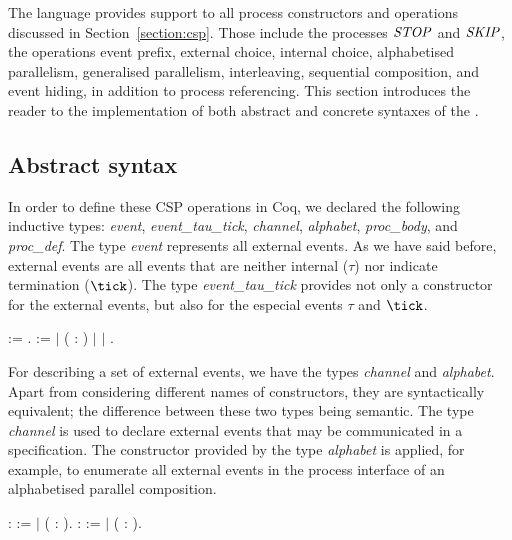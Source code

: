 The \CSPcoq{} language provides support to all process constructors and operations discussed in Section~\ref{section:csp}. Those include the processes $ \mathit{\mathord{{STOP}}} $ and $ \mathit{\mathord{{SKIP}}} $, the operations event prefix, external choice, internal choice, alphabetised parallelism, generalised parallelism, interleaving, sequential composition, and event hiding, in addition to process referencing. This section introduces the reader to the implementation of both abstract and concrete syntaxes of the \CSPcoq{}.

\subsection{Abstract syntax}

In order to define these CSP operations in Coq, we declared the following inductive types: \emph{event}, \emph{event\_tau\_tick}, \emph{channel}, \emph{alphabet}, \emph{proc\_body}, and \emph{proc\_def}. The type \emph{event} represents all external events. As we have said before, external events are all events that are neither internal ($ \tau $) nor indicate termination ($ \tick $). The type \emph{event\_tau\_tick} provides not only a constructor for the external events, but also for the especial events $ \tau $ and $ \tick $.

\begin{coqdoccode}
	\coqdocnoindent
	  := .\coqdoceol
	\coqdocnoindent
	  :=\coqdoceol
	\coqdocindent{1.00em}
	\ensuremath{|}  ( : )\coqdoceol
	\coqdocindent{1.00em}
	\ensuremath{|} \coqdoceol
	\coqdocindent{1.00em}
	\ensuremath{|} .\coqdoceol
\end{coqdoccode}

For describing a set of external events, we have the types \emph{channel} and \emph{alphabet}. Apart from considering different names of constructors, they are syntactically equivalent; the difference between these two types being semantic. The type \emph{channel} is used to declare external events that may be communicated in a \CSPcoq{} specification. The constructor provided by the type \emph{alphabet} is applied, for example, to enumerate all external events in the process interface of an alphabetised parallel composition.

\begin{coqdoccode}
	\coqdocnoindent
	  :  :=\coqdoceol
	\coqdocindent{1.00em}
	\ensuremath{|}  ( :  ).\coqdoceol
	  :  :=\coqdoceol
	\coqdocindent{1.00em}
	\ensuremath{|}  ( :  ).\coqdoceol
\end{coqdoccode}

